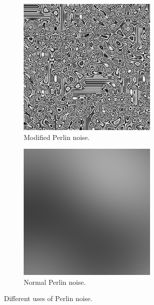 		\begin{figure}[h]
			\begin{subfigure}{0.5\textwidth}
				\centering
				\includegraphics[width=0.9\linewidth]{"Images/floor perlin"}
				\caption[Floored Perlin noise]{Modified Perlin noise.}
				\label{fig:modified-perlin}
			\end{subfigure}
			\begin{subfigure}{0.5\textwidth}
				\centering
				\includegraphics[width=0.9\linewidth]{"Images/normal perlin"}
				\caption[Normal Perlin noise]{Normal Perlin noise.}
				\label{fig:normal-perlin}
			\end{subfigure}
			\caption{Different uses of Perlin noise.}
			\label{fig:normal-and-modified-perlin}
		\end{figure}
		
